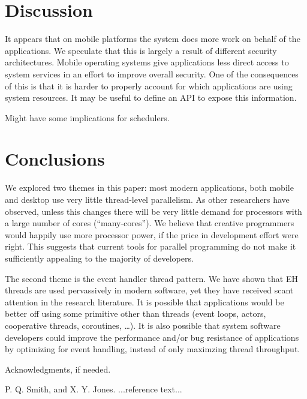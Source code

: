 \documentclass[11pt]{sigplanconf}
\begin{document}
\section{Discussion}

It appears that on mobile platforms the system does more work on behalf
of the applications.  We speculate that this is largely a result of
different security architectures.  Mobile operating systems give
applications less direct access to system services in an effort to
improve overall security.  One of the consequences of this is that it is
harder to properly account for which applications are using system
resources.  It may be useful to define an API to expose this
information.

Might have some implications for schedulers.

\section{Conclusions}

We explored two themes in this paper: most modern applications, both
mobile and desktop use very little thread-level parallelism.  As other
researchers have observed, unless this changes there will be very little
demand for processors with a large number of cores (``many-cores'').  We
believe that creative programmers would happily use more processor
power, if the price in development effort were right.  This suggests
that current tools for parallel programming do not make it sufficiently
appealing to the majority of developers.

The second theme is the event handler thread pattern.  We have shown
that EH threads are used pervassively in modern software, yet they have
received scant attention in the research literature.  It is possible
that applications would be better off using some primitive other than
threads (event loops, actors, cooperative threads, coroutines, \ldots).
It is also possible that system software developers could improve the
performance and/or bug resistance of applications by optimizing for
event handling, instead of only maximzing thread throughput.

\acks

Acknowledgments, if needed.





\begin{thebibliography}{}
\softraggedright

P. Q. Smith, and X. Y. Jones. ...reference text...

\end{thebibliography}
\end{document}
